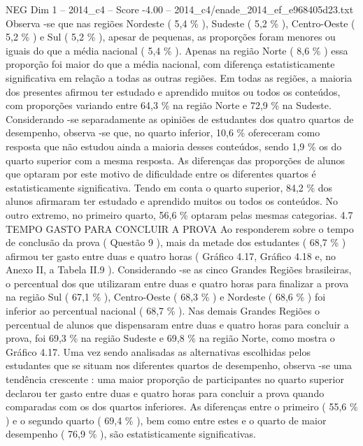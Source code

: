 \begin{textsample}{NEG Dim 1 – 2014\_c4 – Score -4.00 – 2014\_c4/enade\_2014\_ef\_e968405d23.txt}
Observa -se que nas regiões Nordeste ( 5,4 \% ), Sudeste ( 5,2 \% ), Centro-Oeste ( 5,2 \% ) e Sul ( 5,2 \% ), apesar de pequenas, as proporções foram menores ou iguais do que a média nacional ( 5,4 \% ).
Apenas na região Norte ( 8,6 \% ) essa proporção foi maior do que a média nacional, com diferença estatisticamente significativa em relação a todas as outras regiões.
Em todas as regiões, a maioria dos presentes afirmou ter estudado e aprendido muitos ou todos os conteúdos, com proporções variando entre 64,3 \% na região Norte e 72,9 \% na Sudeste.
Considerando -se separadamente as opiniões de estudantes dos quatro quartos de desempenho, observa -se que, no quarto inferior, 10,6 \% ofereceram como resposta que não estudou ainda a maioria desses conteúdos, sendo 1,9 \% os do quarto superior com a mesma resposta.
As diferenças das proporções de alunos que optaram por este motivo de dificuldade entre os diferentes quartos é estatisticamente significativa.
Tendo em conta o quarto superior, 84,2 \% dos alunos afirmaram ter estudado e aprendido muitos ou todos os conteúdos.
No outro extremo, no primeiro quarto, 56,6 \% optaram pelas mesmas categorias. 4.7 TEMPO GASTO PARA CONCLUIR A PROVA Ao responderem sobre o tempo de conclusão da prova ( Questão 9 ), mais da metade dos estudantes ( 68,7 \% ) afirmou ter gasto entre duas e quatro horas ( Gráfico 4.17, Gráfico 4.18 e, no Anexo II, a Tabela II.9 ).
Considerando -se as cinco Grandes Regiões brasileiras, o percentual dos que utilizaram entre duas e quatro horas para finalizar a prova na região Sul ( 67,1 \% ), Centro-Oeste ( 68,3 \% ) e Nordeste ( 68,6 \% ) foi inferior ao percentual nacional ( 68,7 \% ).
Nas demais Grandes Regiões o percentual de alunos que dispensaram entre duas e quatro horas para concluir a prova, foi 69,3 \% na região Sudeste e 69,8 \% na região Norte, como mostra o Gráfico 4.17.
Uma vez sendo analisadas as alternativas escolhidas pelos estudantes que se situam nos diferentes quartos de desempenho, observa -se uma tendência crescente : uma maior proporção de participantes no quarto superior declarou ter gasto entre duas e quatro horas para concluir a prova quando comparadas com os dos quartos inferiores.
As diferenças entre o primeiro ( 55,6 \% ) e o segundo quarto ( 69,4 \% ), bem como entre estes e o quarto de maior desempenho ( 76,9 \% ), são estatisticamente significativas.

\end{textsample}
